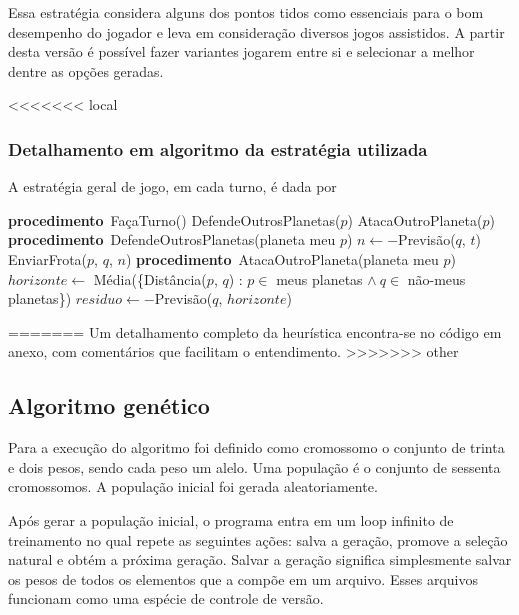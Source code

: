 \documentclass[a4paper,titlepage,11pt]{article}
\newcommand\PROC{\STATE\textbf{procedimento}\ }
\begin{document}
Essa estratégia considera alguns dos pontos tidos como essenciais para o bom desempenho do jogador e leva em consideração diversos jogos assistidos. A partir desta versão é possível fazer variantes jogarem entre si e selecionar a melhor dentre as opções geradas.

<<<<<<< local
\subsubsection{Detalhamento em algoritmo da estratégia utilizada}

A estratégia geral de jogo, em cada turno, é dada por

\begin{algorithmic}
	\PROC FaçaTurno()
	\FORALL {planeta meu $p$}
		\STATE DefendeOutrosPlanetas($p$)
		\STATE AtacaOutroPlaneta($p$)
	\ENDFOR
	\STATE 
	\PROC DefendeOutrosPlanetas(planeta meu $p$)
			\STATE $n \gets  -$Previsão($q$, $t$)
				\STATE EnviarFrota($p$, $q$, $n$)
			\ENDIF
		\ENDIF
	\ENDFOR
	\STATE
	\PROC AtacaOutroPlaneta(planeta meu $p$)
		\STATE $horizonte \gets$ Média(\{Distância($p$, $q$) : $p \in$ meus planetas $\wedge\ q \in$ não-meus planetas\})
			\STATE $residuo \gets -$Previsão($q$, $horizonte$)
				\STATE 
			\ENDIF
		\ENDIF
	\ENDFOR
\end{algorithmic}


=======
Um detalhamento completo da heurística encontra-se no código em anexo, com comentários que facilitam o entendimento.
>>>>>>> other

\subsection{Algoritmo genético}
Para a execução do algoritmo foi definido como cromossomo o conjunto de trinta e dois pesos, sendo cada peso um alelo. Uma população é o conjunto de sessenta cromossomos. A população inicial foi gerada aleatoriamente.

Após gerar a população inicial, o programa entra em um loop infinito de treinamento no qual repete as seguintes ações: salva a geração, promove a seleção natural e obtém a próxima geração. Salvar a geração significa simplesmente salvar os pesos de todos os elementos que a compõe em um arquivo. Esses arquivos funcionam como uma espécie de controle de versão.
\end{document}
